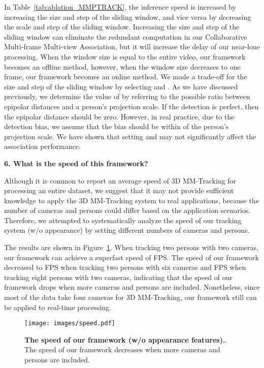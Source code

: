 \documentclass{CVM}
\begin{document}
In Table~\ref{tab:ablation_MMPTRACK}, the inference speed is increased by increasing the size and step of the sliding window, and vice versa by decreasing the scale and step of the sliding window. Increasing the size and step of the sliding window can eliminate the redundant computation in our Collaborative Multi-frame Multi-view
Association, but it will increase the delay of our near-lone processing. When the window size is equal to the entire video, our framework becomes an offline method, however, when the window size decreases to one frame, our framework becomes an online method. We made a trade-off for the size and step of the sliding window by selecting  and . As we have discussed previously, we determine the value of  by referring to the possible ratio between epipolar distances and a person's projection scale. If the detection is perfect, then the epipolar distance should be zero. However, in real practice, due to the detection bias, we assume that the bias should be within  of the person's projection scale. We have shown that setting  and  may not significantly affect the association performance.




\textbf{6. What is the speed of this framework?} 


Although it is common to report an average speed of 3D MM-Tracking for processing an entire dataset, we suggest that it may not provide sufficient knowledge to apply the 3D MM-Tracking system to real applications, because the number of cameras and persons could differ based on the application scenarios. Therefore, we attempted to systematically analyze the speed of our tracking system (w/o appearance) by setting different numbers of cameras and persons. 

The results are shown in Figure~\ref{fig:speed}.
When tracking two persons with two cameras, our framework can achieve a superfast speed of  FPS. The speed of our framework decreased to  FPS when tracking two persons with six cameras and  FPS when tracking eight persons with two cameras, indicating that the speed of our framework drops when more cameras and persons are included. Nonetheless, since most of the data take four cameras for 3D MM-Tracking, our framework still can be applied to real-time processing.

\begin{figure}[!h]
  \centering
  \texttt{[image: images/speed.pdf]}
  \caption{\textbf{The speed of our framework (w/o appearance features).}. The speed of our framework decreases when more cameras and persons are included. }\label{fig:speed}
\end{figure}
\end{document}
